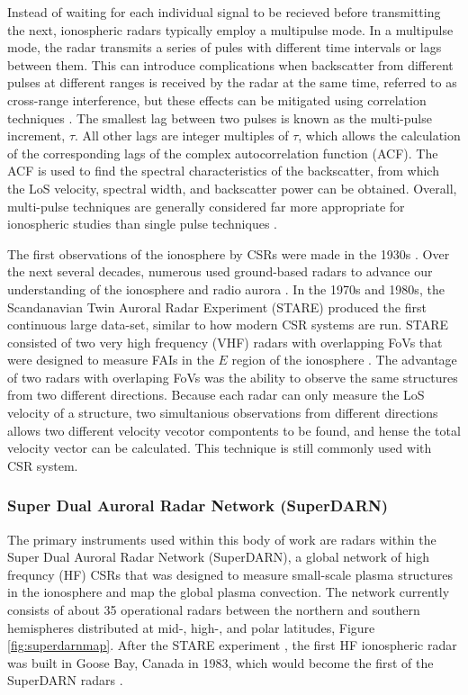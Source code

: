 Instead of waiting for each individual signal to be recieved before transmitting the next, ionospheric radars typically employ a multipulse mode. In a multipulse mode, the radar transmits a series of pules with different time intervals or lags between them.  This can introduce complications when backscatter from different pulses at different ranges is received by the radar at the same time, referred to as cross-range interference, but these effects can be mitigated using correlation techniques \citep{Farley1972}.  The smallest lag between two pulses is known as the multi-pulse increment, \(\tau\).  All other lags are integer multiples of \(\tau\), which allows the calculation of the corresponding lags of the complex autocorrelation function (ACF).  The ACF is used to find the spectral characteristics of the backscatter, from which the LoS velocity, spectral width, and backscatter power can be obtained.  Overall, multi-pulse techniques are generally considered far more appropriate for ionospheric studies than single pulse techniques \citep{Farley1972,Greenwald1983,Greenwald1985,Barthes1998,Ponomarenko2006}.

The first observations of the ionosphere by CSRs were made in the 1930s \citep{Eckersley1937,Harang1938}.  Over the next several decades, numerous used ground-based radars to advance our understanding of the ionosphere and radio aurora \citep{Hultqvist1964,Leadabrand1965,LangeHesse1967,Unwin1972,Sahr1996}.  In the 1970s and 1980s, the Scandanavian Twin Auroral Radar Experiment (STARE) produced the first continuous large data-set, similar to how modern CSR systems are run.  STARE consisted of two very high frequency (VHF) radars with overlapping FoVs that were designed to measure FAIs in the \(E\) region of the ionosphere \citep{Greenwald1997}.  The advantage of two radars with overlaping FoVs was the ability to observe the same structures from two different directions.  Because each radar can only measure the LoS velocity of a structure, two simultanious observations from different directions allows two different velocity vecotor compontents to be found, and hense the total velocity vector can be calculated.  This technique is still commonly used with CSR system.

\subsubsection{Super Dual Auroral Radar Network (SuperDARN)}
\label{sec:superdarn}
The primary instruments used within this body of work are radars within the Super Dual Auroral Radar Network (SuperDARN), a global network of high frequncy (HF) CSRs that was designed to measure small-scale plasma structures in the ionosphere and map the global plasma convection.  The network currently consists of about 35 operational radars between the northern and southern hemispheres distributed at mid-, high-, and polar latitudes, Figure \ref{fig:superdarnmap}.  After the STARE experiment \citep{Greenwald1978}, the first HF ionospheric radar was built in Goose Bay, Canada in 1983, which would become the first of the SuperDARN radars \citep{Greenwald1985}.  

